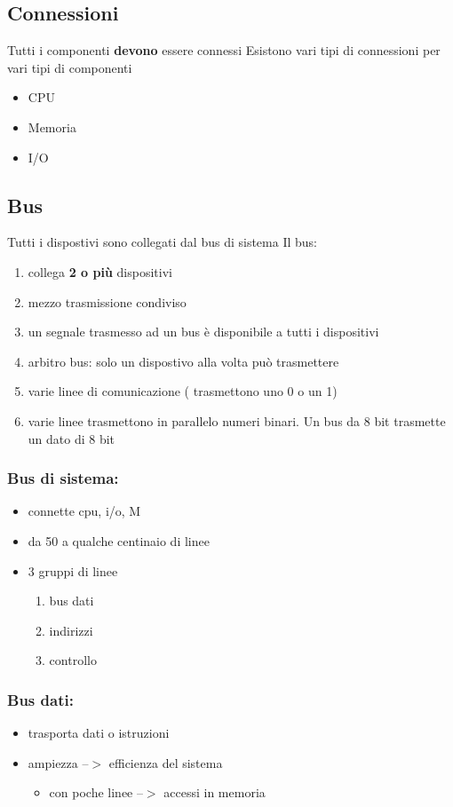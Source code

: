 \documentclass[12pt, a4paper]{article}
\theoremstyle{break}
\theoremstyle{lemma}
\theoremstyle{lemma}
\theoremstyle{lemma}
\begin{document}
\subsection{Connessioni}
Tutti i componenti \textbf{devono} essere connessi \newline
Esistono vari tipi di connessioni per vari tipi di componenti
\begin{itemize}
	\item CPU
	\item Memoria 
	\item I/O
\end{itemize}

\subsection{Bus}
Tutti i dispostivi sono collegati dal bus di sistema \newline
Il bus:
\begin{enumerate}
	\item collega \textbf{2 o più} dispositivi
	\item mezzo trasmissione condiviso
	\item un segnale trasmesso ad un bus è disponibile a tutti i dispositivi
	\item arbitro bus: solo un dispostivo alla volta può trasmettere
	\item varie linee di comunicazione ( trasmettono uno 0 o un 1)
	\item varie linee trasmettono in parallelo numeri binari. Un bus da 8 bit trasmette un dato di 8 bit
\end{enumerate}

\subsubsection{Bus di sistema:}
\begin{itemize}
	\item connette cpu, i/o, M
	\item da 50 a qualche centinaio di linee
	\item 3 gruppi di linee
	\begin{enumerate}
		\item bus dati
		\item indirizzi
		\item controllo
	\end{enumerate}
\end{itemize}

\subsubsection{Bus dati:}
\begin{itemize}
	\item trasporta dati o istruzioni
	\item ampiezza --$ > $ efficienza  del sistema
	\begin{itemize}
		\item con poche linee --$>$ accessi in memoria
	\end{itemize}
\end{itemize}
\end{document}
